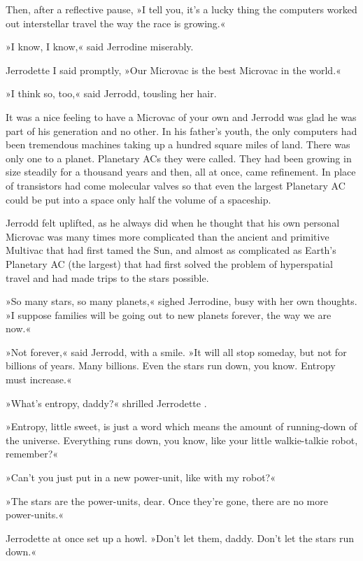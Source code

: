 \documentclass[11pt,twocolumn,paper=a5,pagesize]{article}
\newcommand{\q}[1]{»#1«}
\begin{document}
{Then, after a reflective pause, \q{I tell you, it's a lucky thing the 
computers worked out interstellar travel the way the race is growing.}

\q{I know, I know,} said Jerrodine miserably.

Jerrodette I said promptly, \q{Our Microvac is the best Microvac in the 
world.}

\q{I think so, too,} said Jerrodd, tousling her hair.

It was a nice feeling to have a Microvac of your own and Jerrodd was glad he 
was part of his generation and no other. In his father's youth, the only 
computers had been tremendous machines taking up a hundred square miles of 
land. There was only one to a planet. Planetary ACs they were called. They 
had been growing in size steadily for a thousand years and then, all at 
once, came refinement. In place of transistors had come molecular valves so 
that even the largest Planetary AC could be put into a space only half the 
volume of a spaceship.

Jerrodd felt uplifted, as he always did when he thought that his own personal 
Microvac was many times more complicated than the ancient and primitive 
Multivac that had first tamed the Sun, and almost as complicated as Earth's 
Planetary AC (the largest) that had first solved the problem of hyperspatial 
travel and had made trips to the stars possible.

\q{So many stars, so many planets,} sighed Jerrodine, busy with her own 
thoughts. \q{I suppose families will be going out to new planets forever, 
the way we are now.}

\q{Not forever,} said Jerrodd, with a smile. \q{It will all stop someday, 
but not for billions of years. Many billions. Even the stars run down, 
you know. Entropy must increase.}

\q{What's entropy, daddy?} shrilled Jerrodette 
\MakeUppercase{}.

\q{Entropy, little sweet, is just a word which means the amount of 
running-down of the universe. Everything runs down, you know, like your 
little walkie-talkie robot, remember?}

\q{Can't you just put in a new power-unit, like with my robot?}

\q{The stars are the power-units, dear. Once they're gone, there are no 
more power-units.}

Jerrodette \MakeUppercase{} at once set up a howl. \q{Don't
let them, daddy. Don't let the stars run down.}

}
\end{document}

